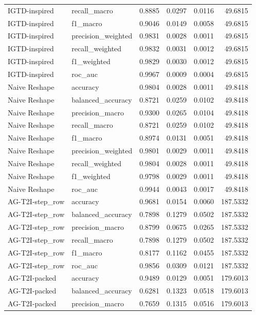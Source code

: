 \begin{tabular}{llrrrr}
IGTD-inspired & recall_macro & 0.8885 & 0.0297 & 0.0116 & 49.6815 \\
IGTD-inspired & f1_macro & 0.9046 & 0.0149 & 0.0058 & 49.6815 \\
IGTD-inspired & precision_weighted & 0.9831 & 0.0028 & 0.0011 & 49.6815 \\
IGTD-inspired & recall_weighted & 0.9832 & 0.0031 & 0.0012 & 49.6815 \\
IGTD-inspired & f1_weighted & 0.9829 & 0.0030 & 0.0012 & 49.6815 \\
IGTD-inspired & roc_auc & 0.9967 & 0.0009 & 0.0004 & 49.6815 \\
Naive Reshape & accuracy & 0.9804 & 0.0028 & 0.0011 & 49.8418 \\
Naive Reshape & balanced_accuracy & 0.8721 & 0.0259 & 0.0102 & 49.8418 \\
Naive Reshape & precision_macro & 0.9300 & 0.0265 & 0.0104 & 49.8418 \\
Naive Reshape & recall_macro & 0.8721 & 0.0259 & 0.0102 & 49.8418 \\
Naive Reshape & f1_macro & 0.8974 & 0.0131 & 0.0051 & 49.8418 \\
Naive Reshape & precision_weighted & 0.9801 & 0.0029 & 0.0011 & 49.8418 \\
Naive Reshape & recall_weighted & 0.9804 & 0.0028 & 0.0011 & 49.8418 \\
Naive Reshape & f1_weighted & 0.9798 & 0.0029 & 0.0011 & 49.8418 \\
Naive Reshape & roc_auc & 0.9944 & 0.0043 & 0.0017 & 49.8418 \\
AG-T2I-step_row & accuracy & 0.9681 & 0.0154 & 0.0060 & 187.5332 \\
AG-T2I-step_row & balanced_accuracy & 0.7898 & 0.1279 & 0.0502 & 187.5332 \\
AG-T2I-step_row & precision_macro & 0.8799 & 0.0675 & 0.0265 & 187.5332 \\
AG-T2I-step_row & recall_macro & 0.7898 & 0.1279 & 0.0502 & 187.5332 \\
AG-T2I-step_row & f1_macro & 0.8177 & 0.1162 & 0.0455 & 187.5332 \\
AG-T2I-step_row & roc_auc & 0.9856 & 0.0309 & 0.0121 & 187.5332 \\
AG-T2I-packed & accuracy & 0.9489 & 0.0129 & 0.0051 & 179.6013 \\
AG-T2I-packed & balanced_accuracy & 0.6281 & 0.1323 & 0.0518 & 179.6013 \\
AG-T2I-packed & precision_macro & 0.7659 & 0.1315 & 0.0516 & 179.6013 \\

\end{tabular}
